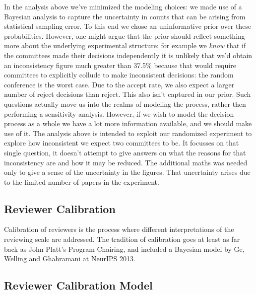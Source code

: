 In the analysis above we've minimized the modeling choices: we made use
of a Bayesian analysis to capture the uncertainty in counts that can be
arising from statistical sampling error. To this end we chose an
uninformative prior over these probabilities. However, one might argue
that the prior should reflect something more about the underlying
experimental structure: for example we \emph{know} that if the
committees made their decisions independently it is unlikely that we'd
obtain an inconsistency figure much greater than 37.5\% because that
would require committees to explicitly collude to make inconsistent
decisions: the random conference is the worst case. Due to the accept
rate, we also expect a larger number of reject decisions than reject.
This also isn't captured in our prior. Such questions actually move us
into the realms of modeling the process, rather then performing a
sensitivity analysis. However, if we wish to model the decision process
as a whole we have a lot more information available, and we should make
use of it. The analysis above is intended to exploit our randomized
experiment to explore how inconsistent we expect two committees to be.
It focusses on that single question, it doesn't attempt to give answers
on what the reasons for that inconsistency are and how it may be
reduced. The additional maths was needed only to give a sense of the
uncertainty in the figures. That uncertainty arises due to the limited
number of papers in the experiment.

\hypertarget{reviewer-calibration}{%
\subsection{Reviewer Calibration}\label{reviewer-calibration}}

\begin{flushright}
\end{flushright}

Calibration of reviewers is the process where different interpretations
of the reviewing scale are addressed. The tradition of calibration goes
at least as far back as John Platt's Program Chairing, and included a
Bayesian model by Ge, Welling and Ghahramani at NeurIPS 2013.

\hypertarget{reviewer-calibration-model}{%
\subsection{Reviewer Calibration
Model}\label{reviewer-calibration-model}}

